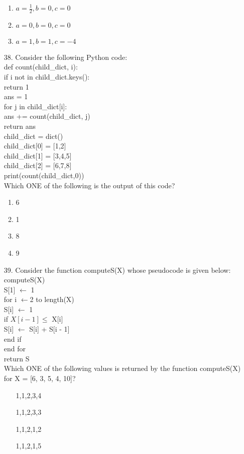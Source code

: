 \documentclass[journal]{IEEEtran}
\begin{document}
\begin{enumerate}
\begin{enumerate}[label = (\Alph*)]
        \item $a=\frac{1}{2}, b = 0, c=0$
        \item $a=0, b = 0, c=0$
        \item $a=1, b = 1, c=-4$
    \end{enumerate}
    \item[38.] Consider the following Python code:\\
    def count(child\_dict, i):\\
     if i not in child\_dict.keys():\\
     return 1\\
     ans = 1\\
     for j in child\_dict[i]:\\
     ans += count(child\_dict, j)\\
     return ans\\
    child\_dict = dict()\\
    child\_dict[0] = [1,2]\\
    child\_dict[1] = [3,4,5]\\
    child\_dict[2] = [6,7,8]\\
    print(count(child\_dict,0))\\
    Which ONE of the following is the output of this code?
    \begin{enumerate}[label = (\Alph*)]
        \item 6
        \item 1
        \item 8
        \item 9 
    \end{enumerate}
    \item[39.]  Consider the function computeS(X) whose pseudocode is given below:
    computeS(X)\\
    S[1] $\leftarrow$ 1\\
    for i $\leftarrow$2 to length(X)\\
     S[i] $\leftarrow$ 1\\
     if $X[i - 1] \leq$ X[i]\\
     S[i] $\leftarrow$ S[i] + S[i - 1]\\
     end if\\
    end for\\
    return S\\
    Which ONE of the following values is returned by the function computeS(X)
    for X = [6, 3, 5, 4, 10]?
    \begin{enumerate}[label = (\Alph*) ]
        \item [1,1,2,3,4]
        \item [1,1,2,3,3]
        \item [1,1,2,1,2]
        \item [1,1,2,1,5]
    \end{enumerate}

\end{enumerate}
\end{document}
